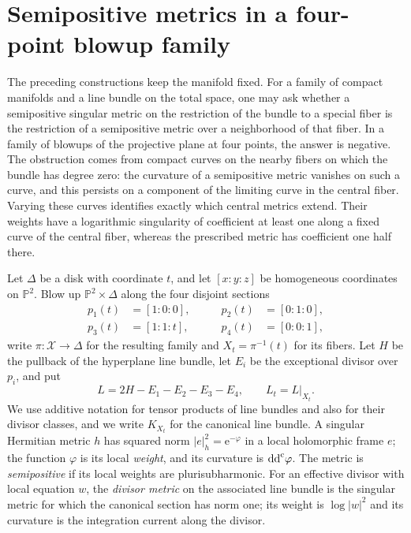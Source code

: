 \section{Semipositive metrics in a four-point blowup family}
\label{sec:four-point-metric-nonextension}

The preceding constructions keep the manifold fixed. For a family of compact manifolds and a line bundle on the total space, one may ask whether a semipositive singular metric on the restriction of the bundle to a special fiber is the restriction of a semipositive metric over a neighborhood of that fiber. In a family of blowups of the projective plane at four points, the answer is negative. The obstruction comes from compact curves on the nearby fibers on which the bundle has degree zero: the curvature of a semipositive metric vanishes on such a curve, and this persists on a component of the limiting curve in the central fiber. Varying these curves identifies exactly which central metrics extend. Their weights have a logarithmic singularity of coefficient at least one along a fixed curve of the central fiber, whereas the prescribed metric has coefficient one half there.

Let $\Delta$ be a disk with coordinate $t$, and let $[x:y:z]$ be homogeneous coordinates on $\mathbb P^2$. Blow up $\mathbb P^2\times\Delta$ along the four disjoint sections
\[
 \begin{aligned}
 p_1(t)&=[1:0:0],&\qquad p_2(t)&=[0:1:0],\\
 p_3(t)&=[1:1:t],&\qquad p_4(t)&=[0:0:1],
 \end{aligned}
\]
write $\pi\colon\mathcal X\to\Delta$ for the resulting family and $X_t=\pi^{-1}(t)$ for its fibers. Let $H$ be the pullback of the hyperplane line bundle, let $E_i$ be the exceptional divisor over $p_i$, and put
\[
 L=2H-E_1-E_2-E_3-E_4,\qquad L_t=L|_{X_t}.
\]
We use additive notation for tensor products of line bundles and also for their divisor classes, and we write $K_{X_t}$ for the canonical line bundle. A singular Hermitian metric $h$ has squared norm $|e|_h^2=\mathrm{e}^{-\varphi}$ in a local holomorphic frame $e$; the function $\varphi$ is its local \emph{weight}, and its curvature is $\mathrm{dd}^{\mathrm{c}}\varphi$. The metric is \emph{semipositive} if its local weights are plurisubharmonic. For an effective divisor with local equation $w$, the \emph{divisor metric} on the associated line bundle is the singular metric for which the canonical section has norm one; its weight is $\log|w|^2$ and its curvature is the integration current along the divisor.

